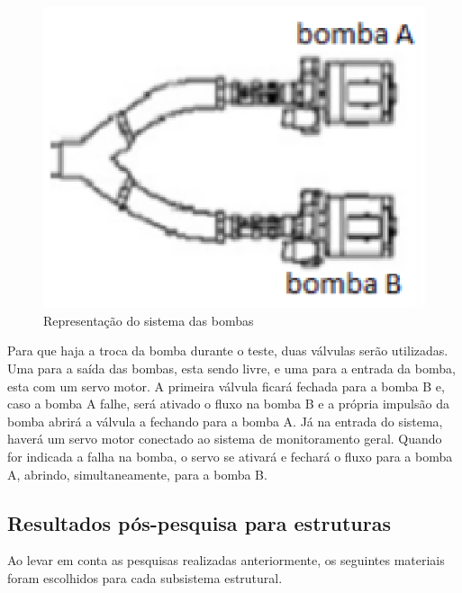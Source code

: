 \begin{figure}[!htb]                                                               
   \centering                                                                      
   \includegraphics[scale=0.6, keepaspectratio=true]{figuras/conexaobombas.eps} 
   \caption{Representação do sistema das bombas}
\end{figure}

Para que haja a troca da bomba durante o teste, duas válvulas serão utilizadas. Uma para a saída das bombas, esta sendo livre, e uma para a entrada da bomba, esta com um servo motor. A primeira válvula ficará fechada para a bomba B e, caso a bomba A falhe, será ativado o fluxo na bomba B e a própria impulsão da bomba abrirá a válvula a fechando para a bomba A. Já na entrada do sistema, haverá um servo motor conectado ao sistema de monitoramento geral. Quando for indicada a falha na bomba, o servo se ativará e fechará o fluxo para a bomba A, abrindo, simultaneamente, para a bomba B.


\subsection{Resultados pós-pesquisa para estruturas}

Ao levar em conta as pesquisas realizadas anteriormente, os seguintes materiais foram escolhidos para cada subsistema estrutural.

